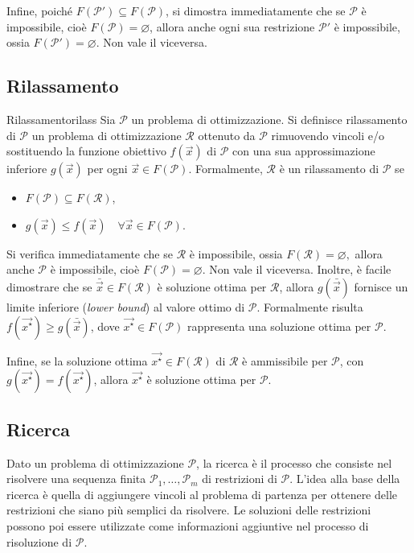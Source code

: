 Infine, poiché \( F(\mathcal{P}') \subseteq F(\mathcal{P}) \), si dimostra immediatamente che se \( \mathcal{P} \) è
impossibile, cioè \( F(\mathcal{P}) = \varnothing \), allora anche ogni sua restrizione \( \mathcal{P}' \) è
impossibile, ossia \( F(\mathcal{P}') = \varnothing \). Non vale il viceversa.

\subsection{Rilassamento}
\begin{definition}{Rilassamento}{rilass}
    Sia \( \mathcal{P} \) un problema di ottimizzazione. Si definisce rilassamento di \( \mathcal{P} \) un problema di
    ottimizzazione \( \mathcal{R} \) ottenuto da \( \mathcal{P} \) rimuovendo vincoli e/o sostituendo la funzione
    obiettivo \( f(\vec{x}) \) di \( \mathcal{P} \) con una sua approssimazione inferiore \( g(\vec{x}) \) per ogni \(
    \vec{x} \in F(\mathcal{P}) \). Formalmente, \( \mathcal{R} \) è un rilassamento di \( \mathcal{P} \) se
    \begin{itemize}
        \item \( F(\mathcal{P}) \subseteq F(\mathcal{R}) \),
        \item \( g(\vec{x}) \leq f(\vec{x}) \quad \forall \vec{x} \in F(\mathcal{P}) \).
    \end{itemize}
\end{definition}
\noindent
Si verifica immediatamente che se \( \mathcal{R} \) è impossibile, ossia
\(
    F(\mathcal{R}) = \varnothing,
\)
allora anche \( \mathcal{P} \) è impossibile, cioè \( F(\mathcal{P}) = \varnothing \). Non vale il viceversa. Inoltre, è
facile dimostrare che se \( \bar{\vec{x}} \in F(\mathcal{R}) \) è soluzione ottima per \( \mathcal{R} \), allora \(
g(\bar{\vec{x}}) \) fornisce un limite inferiore (\textit{lower bound}) al valore ottimo di \( \mathcal{P} \).
Formalmente risulta \( f(\vec{x^{\star}}) \geq g(\bar{\vec{x}}) \), dove
\(
    \vec{x^{\star}} \in F(\mathcal{P})
\)
rappresenta una soluzione ottima per
\(
    \mathcal{P}.
\)

Infine, se la soluzione ottima \( \vec{x^{\star}} \in F(\mathcal{R}) \) di \( \mathcal{R} \) è ammissibile per \(
\mathcal{P} \), con \( g(\vec{x^{\star}}) = f(\vec{x^{\star}}) \), allora \( \vec{x^{\star}} \) è soluzione ottima per
\( \mathcal{P} \).

\subsection{Ricerca}
Dato un problema di ottimizzazione \( \mathcal{P} \), la ricerca è il processo che consiste nel risolvere una sequenza
finita
\(
    \mathcal{P}_1, \ldots, \mathcal{P}_m
\)
di restrizioni di \( \mathcal{P} \). L'idea alla base della ricerca è quella di aggiungere vincoli al problema di
partenza per ottenere delle restrizioni che siano più semplici da risolvere. Le soluzioni delle restrizioni possono poi
essere utilizzate come informazioni aggiuntive nel processo di risoluzione di \( \mathcal{P} \).

